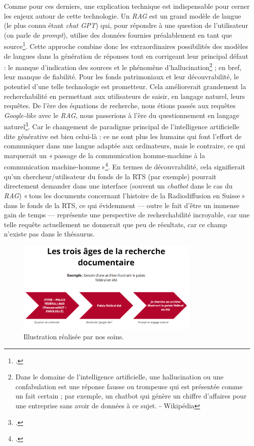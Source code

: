 Comme pour ces derniers, une explication technique est indispensable pour cerner les enjeux autour de cette technologie. Un \textit{RAG} est un grand modèle de langue (le plus connu étant \textit{chat GPT}) qui, pour répondre à une question de l’utilisateur (on parle de \textit{prompt}), utilise des données fournies préalablement en tant que source\footcite{pouyllau_quels_2024}. Cette approche combine donc les extraordinaires possibilités des modèles de langues dans la génération de réponses tout en corrigeant leur principal défaut : le manque d’indication des sources et le phénomène d’hallucination\footnote{Dans le domaine de l'intelligence artificielle, une hallucination ou une confabulation est une réponse fausse ou trompeuse qui est présentée comme un fait certain ; par exemple, un chatbot qui génère un chiffre d'affaires pour une entreprise sans avoir de données à ce sujet. - Wikipédia} ; en bref, leur manque de fiabilité. Pour les fonds patrimoniaux et leur découvrabilité, le potentiel d’une telle technologie est prometteur. Cela améliorerait grandement la recherchabilité en permettant aux utilisateurs de saisir, en langage naturel, leurs requêtes. De l’ère des équations de recherche, nous étions passés aux requêtes \textit{Google-like} avec le \textit{RAG}, nous passerions à l’ère du questionnement en langage naturel\footcite{bermes_futur_2024}. Car le changement de paradigme principal de l’intelligence artificielle dite générative est bien celui-là : ce ne sont plus les humains qui font l’effort de communiquer dans une langue adaptée aux ordinateurs, mais le contraire, ce qui marquerait un « passage de la communication homme-machine à la communication machine-homme »\footcite[p. 7]{pillaud_et_2024}. En termes de découvrabilité, cela signifierait qu’un chercheur/utilisateur du fonds de la RTS (par exemple) pourrait directement demander dans une interface (souvent un \textit{chatbot} dans le cas du \textit{RAG}) « tous les documents concernant l’histoire de la Radiodiffusion en Suisse » dans le fonds de la RTS, ce qui évidemment — outre le fait d’être un immense gain de temps — représente une perspective de recherchabilité incroyable, car une telle requête actuellement ne donnerait que peu de résultats, car ce champ n’existe pas dans le thésaurus.


\begin{figure}[h!]
	\centering
	\includegraphics[width=0.8\textwidth]{images/image23.png}
	\caption{Illustration réalisée par nos soins.}
	\label{fig:image23}
\end{figure}

